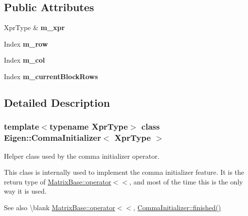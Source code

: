 \subsection*{Public Attributes}
\begin{DoxyCompactItemize}
\item 
\mbox{\label{struct_eigen_1_1_comma_initializer_a0e012d28c281acfd727bf3e99780c919}} 
Xpr\+Type \& {\bfseries m\+\_\+xpr}
\item 
\mbox{\label{struct_eigen_1_1_comma_initializer_afac25de119210f2df4d814694b6c56f6}} 
Index {\bfseries m\+\_\+row}
\item 
\mbox{\label{struct_eigen_1_1_comma_initializer_ab31bf5a9a85ca7afd84b7adf4baaaa5a}} 
Index {\bfseries m\+\_\+col}
\item 
\mbox{\label{struct_eigen_1_1_comma_initializer_a9a6ad628399cc4aa31bafe8df7beb850}} 
Index {\bfseries m\+\_\+current\+Block\+Rows}
\end{DoxyCompactItemize}


\subsection{Detailed Description}
\subsubsection*{template$<$typename Xpr\+Type$>$\newline
class Eigen\+::\+Comma\+Initializer$<$ Xpr\+Type $>$}

Helper class used by the comma initializer operator. 

This class is internally used to implement the comma initializer feature. It is the return type of \mbox{\hyperlink{class_eigen_1_1_dense_base_a0e575eb0ba6cc6bc5f347872abd8509d}{Matrix\+Base\+::operator$<$$<$}}, and most of the time this is the only way it is used.

\begin{DoxySeeAlso}{See also}
\textbackslash{}blank \mbox{\hyperlink{class_eigen_1_1_dense_base_MatrixBaseCommaInitRef}{Matrix\+Base\+::operator$<$$<$}}, \mbox{\hyperlink{struct_eigen_1_1_comma_initializer_a3be7de7fb3e8d3c4d3063f480181b17f}{Comma\+Initializer\+::finished()}} 
\end{DoxySeeAlso}


